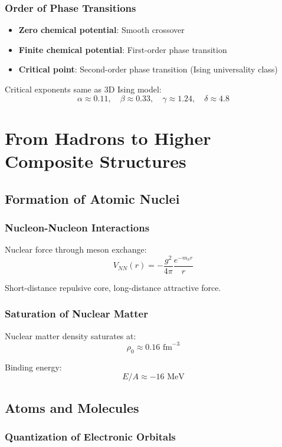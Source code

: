 \documentclass[11pt]{article}
\begin{document}
\subsubsection{Order of Phase Transitions}

\begin{itemize}
\item \textbf{Zero chemical potential}: Smooth crossover
\item \textbf{Finite chemical potential}: First-order phase transition
\item \textbf{Critical point}: Second-order phase transition (Ising universality class)
\end{itemize}

Critical exponents same as 3D Ising model:
$$\alpha \approx 0.11, \quad \beta \approx 0.33, \quad \gamma \approx 1.24, \quad \delta \approx 4.8$$

\section{From Hadrons to Higher Composite Structures}

\subsection{Formation of Atomic Nuclei}

\subsubsection{Nucleon-Nucleon Interactions}

Nuclear force through meson exchange:
$$V_{NN}(r) = -\frac{g^2}{4\pi} \frac{e^{-m_{\pi} r}}{r}$$

Short-distance repulsive core, long-distance attractive force.

\subsubsection{Saturation of Nuclear Matter}

Nuclear matter density saturates at:
$$\rho_0 \approx 0.16 \text{ fm}^{-3}$$

Binding energy:
$$E/A \approx -16 \text{ MeV}$$

\subsection{Atoms and Molecules}

\subsubsection{Quantization of Electronic Orbitals}
\end{document}
